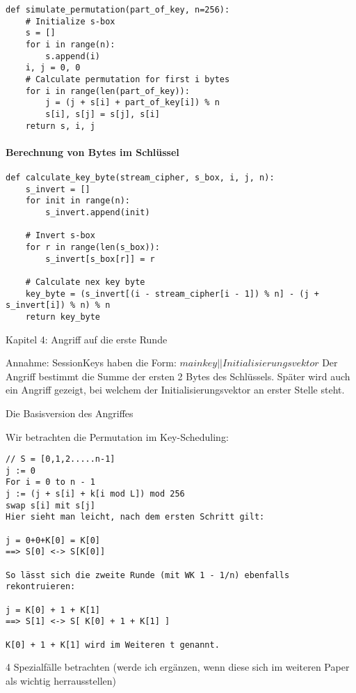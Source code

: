 \documentclass[10pt,a4paper]{article}
\begin{document}
\begin{lstlisting}
def simulate_permutation(part_of_key, n=256):
    # Initialize s-box
    s = []
    for i in range(n):
        s.append(i)
    i, j = 0, 0
    # Calculate permutation for first i bytes
    for i in range(len(part_of_key)):
        j = (j + s[i] + part_of_key[i]) % n
        s[i], s[j] = s[j], s[i]
    return s, i, j
\end{lstlisting}
\paragraph{Berechnung von Bytes im Schlüssel} 
\begin{lstlisting}
def calculate_key_byte(stream_cipher, s_box, i, j, n):
    s_invert = []
    for init in range(n):
        s_invert.append(init)

    # Invert s-box
    for r in range(len(s_box)):
        s_invert[s_box[r]] = r

    # Calculate nex key byte
    key_byte = (s_invert[(i - stream_cipher[i - 1]) % n] - (j + s_invert[i]) % n) % n
    return key_byte
\end{lstlisting}

Kapitel 4: Angriff auf die erste Runde

Annahme: SessionKeys haben die Form: $main key || Initialisierungsvektor$
Der Angriff bestimmt die Summe der ersten 2 Bytes des Schlüssels. Später wird auch ein Angriff gezeigt, bei welchem der Initialisierungsvektor an erster Stelle steht.

Die Basisversion des Angriffes

Wir betrachten die Permutation im Key-Scheduling:

\begin{verbatim}
// S = [0,1,2.....n-1]
j := 0
For i = 0 to n - 1
j := (j + s[i] + k[i mod L]) mod 256
swap s[i] mit s[j]
Hier sieht man leicht, nach dem ersten Schritt gilt:

j = 0+0+K[0] = K[0]  
==> S[0] <-> S[K[0]] 
 
So lässt sich die zweite Runde (mit WK 1 - 1/n) ebenfalls rekontruieren:

j = K[0] + 1 + K[1]  
==> S[1] <-> S[ K[0] + 1 + K[1] ]  

K[0] + 1 + K[1] wird im Weiteren t genannt.

\end{verbatim}

4 Spezialfälle betrachten (werde ich ergänzen, wenn diese sich im weiteren Paper als wichtig herrausstellen)
\end{document}
